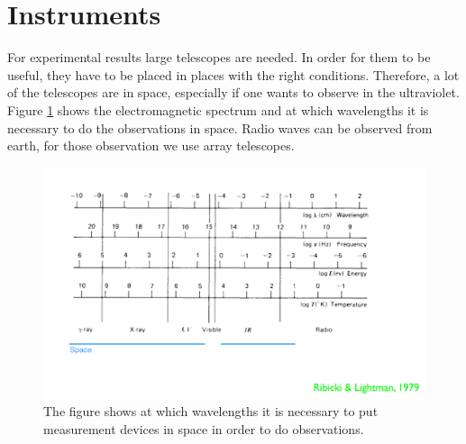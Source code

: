 \section{Instruments}
For experimental results large telescopes are needed. In order for them to be useful, they have to be placed in places with the right conditions. Therefore, a lot of the telescopes are in space, especially if one wants to observe in the ultraviolet. Figure \ref{fig:electromagneticspectrum} shows the electromagnetic spectrum and at which wavelengths it is necessary to do the observations in space. Radio waves can be observed from earth, for those observation we use array telescopes. 
\begin{figure}[H]
	\centering
		\includegraphics[width=1.0\textwidth]{img/ch-01/electromagneticspectrum.png}
		\caption{The figure shows at which wavelengths it is necessary to put measurement devices in space in order to do observations.}
		\label{fig:electromagneticspectrum}
\end{figure}

